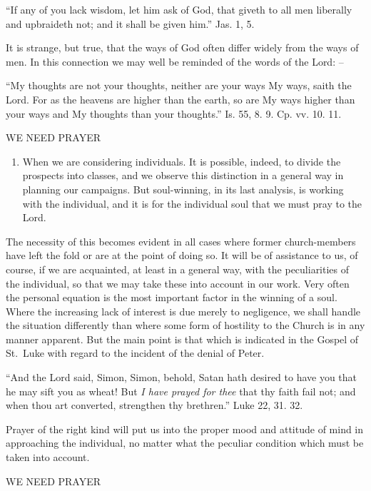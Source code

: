 \documentclass[
]{book}
\providecommand{\tightlist}{%
  \setlength{\itemsep}{0pt}\setlength{\parskip}{0pt}}
\begin{document}
``If any of you lack wisdom, let him ask of God, that giveth to all men liberally and upbraideth not; and it shall be given him.'' Jas. 1, 5.

It is strange, but true, that the ways of God often differ widely from the ways of men. In this connection we may well be reminded of the words of the Lord: --

``My thoughts are not your thoughts, neither are your ways My ways, saith the Lord. For as the heavens are higher than the earth, so are My ways higher than your ways and My thoughts than your thoughts.'' Is. 55, 8. 9. Cp. vv. 10. 11.

WE NEED PRAYER

\begin{enumerate}
\def\labelenumi{\alph{enumi}.}
\setcounter{enumi}{1}
\tightlist
\item
  When we are considering individuals. It is possible, indeed, to divide the prospects into classes, and we observe this distinction in a general way in planning our campaigns. But soul-winning, in its last analysis, is working with the individual, and it is for the individual soul that we must pray to the Lord.
\end{enumerate}

The necessity of this becomes evident in all cases where former church-members have left the fold or are at the point of doing so. It will be of assistance to us, of course, if we are acquainted, at least in a general way, with the peculiarities of the individual, so that we may take these into account in our work. Very often the personal equation is the most important factor in the winning of a soul. Where the increasing lack of interest is due merely to negligence, we shall handle the situation differently than where some form of hostility to the Church is in any manner apparent. But the main point is that which is indicated in the Gospel of St.~Luke with regard to the incident of the denial of Peter.

``And the Lord said, Simon, Simon, behold, Satan hath desired to have you that he may sift you as wheat! But \emph{I have prayed for thee} that thy faith fail not; and when thou art converted, strengthen thy brethren.'' Luke 22, 31. 32.

Prayer of the right kind will put us into the proper mood and attitude of mind in approaching the individual, no matter what the peculiar condition which must be taken into account.

WE NEED PRAYER
\end{document}
